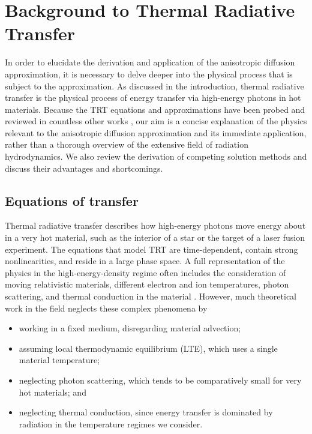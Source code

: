 
\chapter{Background to Thermal Radiative Transfer}\label{chap:trtBackground}

In order to elucidate the derivation and application of the anisotropic
diffusion approximation, it is necessary to delve deeper into the physical
process that is subject to the approximation. As discussed in the introduction,
thermal radiative transfer is the physical process of energy transfer via
high-energy photons in hot materials. Because the TRT equations and
approximations have been probed and reviewed in countless other works
\cite{Mih1984,Pom1973,Cas2004,Wol2008}, our aim is a concise explanation of the
physics relevant to the anisotropic diffusion approximation and its immediate
application, rather than a thorough overview of the extensive field of radiation
hydrodynamics. We also review the derivation of competing solution methods and
discuss their advantages and shortcomings.

\section{Equations of transfer}\label{sec:bgTrtEquations}
Thermal radiative transfer describes how high-energy photons move energy about
in a very hot material, such as the interior of a star or the target of a laser
fusion experiment. The equations that model TRT are time-dependent, contain
strong nonlinearities, and reside in a large phase space.
A full representation of the physics in
the high-energy-density regime often includes the consideration of moving
relativistic materials, different electron and ion temperatures, photon
scattering, and thermal conduction in the material \cite{Mih1984}. However,
much theoretical work in the field neglects these complex phenomena by
\begin{itemize}
  \item working in a fixed medium, disregarding material advection;
  \item assuming local thermodynamic equilibrium (LTE), which uses a single
    material temperature;
  \item neglecting photon scattering, which tends to be comparatively small for
    very hot materials; and
  \item neglecting thermal conduction, since energy transfer is dominated by
    radiation in the temperature regimes we consider.
\end{itemize}

